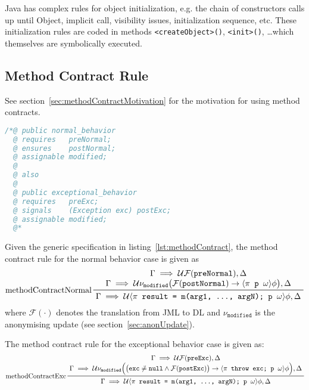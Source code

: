 		Java has complex rules for object initialization, e.g. the chain of constructors calls up until Object, implicit  call, visibility issues, initialization sequence, etc. These initialization rules are coded in methods \texttt{<createObject>()}, \texttt{<init>()}, \dots which themselves are symbolically executed.

	\subsection{Method Contract Rule}
		\label{sec:methodContract}

		See section~\ref{sec:methodContractMotivation} for the motivation for using method contracts.

		\begin{lstlisting}[caption = { Method Contract Rule Specification Example }, label = lst:methodContract, language = Java]
/*@ public normal_behavior
  @ requires   preNormal;
  @ ensures    postNormal;
  @ assignable modified;
  @
  @ also
  @
  @ public exceptional_behavior
  @ requires   preExc;
  @ signals    (Exception exc) postExc;
  @ assignable modified;
  @*
			\end{lstlisting}

		Given the generic specification in listing~\ref{lst:methodContract}, the method contract rule for the normal behavior case is given as
		\begin{equation*}
			\prftree[l]
			{methodContractNormal}
			{\let\scriptstyle\textstyle \substack{
					\Gamma \implies \mathcal{U} \mathcal{F}(\texttt{preNormal}), \Delta \\
					\Gamma \implies \mathcal{U} \nu_\texttt{modified} \big( \mathcal{F}(\texttt{postNormal}) \to \langle \pi \texttt{ p } \omega \rangle \phi \big), \Delta}}
			{\Gamma \implies \mathcal{U} \langle \pi \texttt{ result = m(arg1, ..., argN); p } \omega \rangle \phi, \Delta}
		\end{equation*}
		where \( \mathcal{F}(\cdot) \) denotes the translation from JML to DL and \( \nu_\texttt{modified} \) is the anonymising update (see section~\ref{sec:anonUpdate}).

		The method contract rule for the exceptional behavior case is given as:
		\begin{equation*}
			\prftree[l]
			{methodContractExc}
			{\let\scriptstyle\textstyle \substack{
					\Gamma \implies \mathcal{U} \mathcal{F}(\texttt{preExc}), \Delta \\
					\Gamma \implies \mathcal{U} \nu_\texttt{modified} \Big( \big( \texttt{exc} \not\doteq \texttt{null} \land \mathcal{F}(\texttt{postExc}) \big) \to \langle \pi \texttt{ throw exc; p } \omega \rangle \phi \Big), \Delta}}
			{\Gamma \implies \mathcal{U} \langle \pi \texttt{ result = m(arg1, ..., argN); p } \omega \rangle \phi, \Delta}
		\end{equation*}


